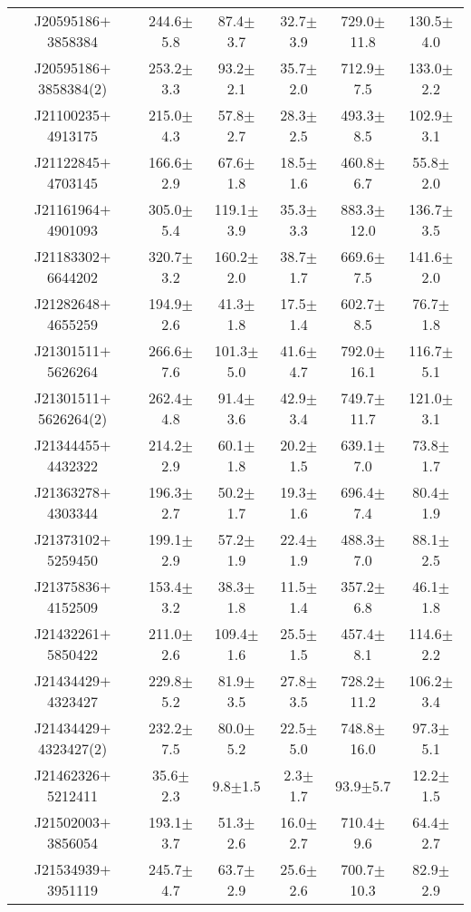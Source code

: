 \documentclass[printer]{aa} %
\begin{document}
\begin{table*}
\begin{tabular}{c c c c c c}
 J20595186$+$3858384  & 244.6$\pm$5.8 & 87.4$\pm$3.7 & 32.7$\pm$3.9 & 729.0$\pm$11.8 & 130.5$\pm$4.0\\ 
 J20595186$+$3858384(2) & 253.2$\pm$3.3 & 93.2$\pm$2.1 & 35.7$\pm$2.0 & 712.9$\pm$7.5 & 133.0$\pm$2.2\\ 
 J21100235$+$4913175  & 215.0$\pm$4.3 & 57.8$\pm$2.7 & 28.3$\pm$2.5 & 493.3$\pm$8.5 & 102.9$\pm$3.1\\ 
 J21122845$+$4703145  & 166.6$\pm$2.9 & 67.6$\pm$1.8 & 18.5$\pm$1.6 & 460.8$\pm$6.7 & 55.8$\pm$2.0\\ 
 J21161964$+$4901093  & 305.0$\pm$5.4 & 119.1$\pm$3.9 & 35.3$\pm$3.3 & 883.3$\pm$12.0 & 136.7$\pm$3.5\\ 
 J21183302$+$6644202  & 320.7$\pm$3.2 & 160.2$\pm$2.0 & 38.7$\pm$1.7 & 669.6$\pm$7.5 & 141.6$\pm$2.0\\ 
 J21282648$+$4655259  & 194.9$\pm$2.6 & 41.3$\pm$1.8 & 17.5$\pm$1.4 & 602.7$\pm$8.5 & 76.7$\pm$1.8\\ 
 J21301511$+$5626264  & 266.6$\pm$7.6 & 101.3$\pm$5.0 & 41.6$\pm$4.7 & 792.0$\pm$16.1 & 116.7$\pm$5.1\\ 
 J21301511$+$5626264(2)  & 262.4$\pm$4.8 & 91.4$\pm$3.6 & 42.9$\pm$3.4 & 749.7$\pm$11.7 & 121.0$\pm$3.1\\ 
 J21344455$+$4432322  & 214.2$\pm$2.9 & 60.1$\pm$1.8 & 20.2$\pm$1.5 & 639.1$\pm$7.0 & 73.8$\pm$1.7\\ 
 J21363278$+$4303344  & 196.3$\pm$2.7 & 50.2$\pm$1.7 & 19.3$\pm$1.6 & 696.4$\pm$7.4 & 80.4$\pm$1.9\\ 
 J21373102$+$5259450  & 199.1$\pm$2.9 & 57.2$\pm$1.9 & 22.4$\pm$1.9 & 488.3$\pm$7.0 & 88.1$\pm$2.5\\ 
 J21375836$+$4152509  & 153.4$\pm$3.2 & 38.3$\pm$1.8 & 11.5$\pm$1.4 & 357.2$\pm$6.8 & 46.1$\pm$1.8\\ 
 J21432261$+$5850422  & 211.0$\pm$2.6 & 109.4$\pm$1.6 & 25.5$\pm$1.5 & 457.4$\pm$8.1 & 114.6$\pm$2.2\\ 
 J21434429$+$4323427  & 229.8$\pm$5.2 & 81.9$\pm$3.5 & 27.8$\pm$3.5 & 728.2$\pm$11.2 & 106.2$\pm$3.4\\ 
 J21434429$+$4323427(2)  & 232.2$\pm$7.5 & 80.0$\pm$5.2 & 22.5$\pm$5.0 & 748.8$\pm$16.0 & 97.3$\pm$5.1\\ 
 J21462326$+$5212411  & 35.6$\pm$2.3 & 9.8$\pm$1.5 & 2.3$\pm$1.7 & 93.9$\pm$5.7 & 12.2$\pm$1.5\\ 
 J21502003$+$3856054  & 193.1$\pm$3.7 & 51.3$\pm$2.6 & 16.0$\pm$2.7 & 710.4$\pm$9.6 & 64.4$\pm$2.7\\ 
 J21534939$+$3951119  & 245.7$\pm$4.7 & 63.7$\pm$2.9 & 25.6$\pm$2.6 & 700.7$\pm$10.3 & 82.9$\pm$2.9\\ 

\end{tabular}
\end{table*}
\end{document}
